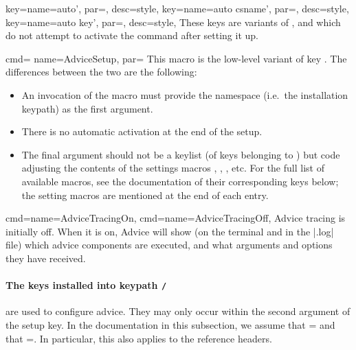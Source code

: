 \documentclass[a4paper,11pt]{article}
\begin{document}
\begin{doc}{
    key={name=auto', par=, desc=style},
    key={name=auto csname', par=, desc=style},
    key={name=auto key', par=, desc=style},
  }
  These keys are variants of ,  and
   which do not attempt to activate the command after setting
  it up.
\end{doc}

\begin{doc}{
    cmd={
      name=AdviceSetup,
      par=
    }}
  This macro is the low-level variant of key .  The differences
  between the two are the following:
  \begin{itemize}
  \item An invocation of the macro must provide the namespace (i.e.\ the
    installation keypath) as the first argument.
  \item There is no automatic activation at the end of the setup.
  \item The final argument should not be a keylist (of keys belonging to
    ) but  code adjusting the contents of the
    settings macros , ,
    , etc.  For the full list of available macros, see
    the documentation of their corresponding keys below; the setting macros are
    mentioned at the end of each entry.
  \end{itemize}
\end{doc}

\begin{doc}{
    cmd={name=AdviceTracingOn},
    cmd={name=AdviceTracingOff},
  }
  Advice tracing is initially off. When it is on, Advice will show (on the
  terminal and in the |.log| file) which advice components are executed, and
  what arguments and options they have received.
\end{doc}

\paragraph*{The keys installed into keypath \texttt{/}}
are used to configure advice.  They may only occur within the second
argument of the setup key.  In the documentation in this subsection, we assume
that = and that =.  In particular, this also applies to the reference
headers.
\end{document}
